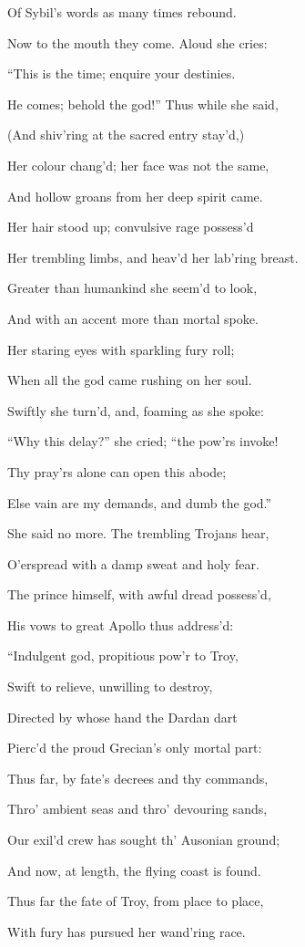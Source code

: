 Of Sybil’s words as many times rebound.

Now to the mouth they come. Aloud she cries:

“This is the time; enquire your destinies.

He comes; behold the god!” Thus while she said,

(And shiv’ring at the sacred entry stay’d,)

Her colour chang’d; her face was not the same,

And hollow groans from her deep spirit came.

Her hair stood up; convulsive rage possess’d

Her trembling limbs, and heav’d her lab’ring breast.

Greater than humankind she seem’d to look,

And with an accent more than mortal spoke.

Her staring eyes with sparkling fury roll;

When all the god came rushing on her soul.

Swiftly she turn’d, and, foaming as she spoke:

“Why this delay?” she cried; “the pow’rs invoke!

Thy pray’rs alone can open this abode;

Else vain are my demands, and dumb the god.”

She said no more. The trembling Trojans hear,

O’erspread with a damp sweat and holy fear.

The prince himself, with awful dread possess’d,

His vows to great Apollo thus address’d:

“Indulgent god, propitious pow’r to Troy,

Swift to relieve, unwilling to destroy,

Directed by whose hand the Dardan dart

Pierc’d the proud Grecian’s only mortal part:

Thus far, by fate’s decrees and thy commands,

Thro’ ambient seas and thro’ devouring sands,

Our exil’d crew has sought th’ Ausonian ground;

And now, at length, the flying coast is found.

Thus far the fate of Troy, from place to place,

With fury has pursued her wand’ring race.


